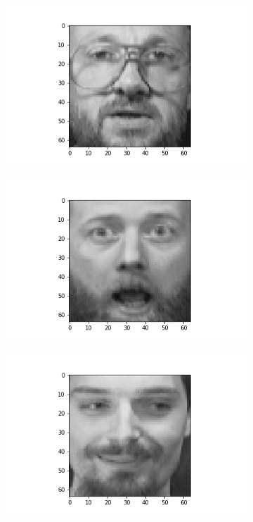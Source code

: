 \documentclass[12pt, a4paper]{article}
\begin{document}
\begin{figure}[h]
\begin{subfigure}{0.3\linewidth}
    \end{subfigure}
    \newline
    \begin{subfigure}{0.3\linewidth}
        \centering
        \includegraphics[width=\linewidth]{images/q3/c/7/6.png}
    \end{subfigure}
    \hfill
    \begin{subfigure}{0.3\linewidth}
        \centering
        \includegraphics[width=\linewidth]{images/q3/c/7/7.png}
    \end{subfigure}
    \hfill
    \begin{subfigure}{0.3\linewidth}
        \centering
        \includegraphics[width=\linewidth]{images/q3/c/7/8.png}

\end{subfigure}
\end{figure}
\end{document}
